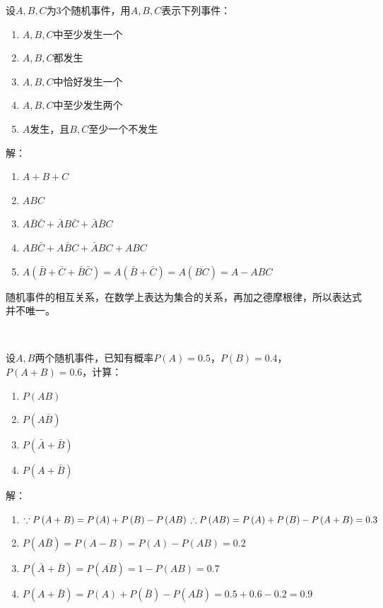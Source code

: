 \begin{example}
设$A,B,C$为3个随机事件，用$A,B,C$表示下列事件：
\begin{enumerate}
    \item $A,B,C$中至少发生一个
    \item $A,B,C$都发生
    \item $A,B,C$中恰好发生一个
    \item $A,B,C$中至少发生两个
    \item $A$发生，且$B,C$至少一个不发生
\end{enumerate}
\end{example}

解：

\begin{enumerate}
    \item $A+B+C$
    \item $ABC$
    \item $A\bar{B}\bar{C}+\bar{A}B\bar{C}+\bar{A}\bar{B}C$
    \item $AB\bar{C}+A\bar{B}C+\bar{A}BC+ABC$
    \item $A\left( \bar{B}+\bar{C}+\bar{B}\bar{C} \right) =A\left( \bar{B}+\bar{C} \right) =A\left( \overline{BC} \right) =A-ABC$
\end{enumerate}

\begin{tcolorbox}
随机事件的相互关系，在数学上表达为集合的关系，再加之德摩根律，所以表达式并不唯一。
\end{tcolorbox}

~

\begin{example}
设$A,B$两个随机事件，已知有概率$P\left( A \right) =0.5$，$P\left( B \right) =0.4$，$P\left( A+B \right) =0.6$，计算：
\begin{enumerate}
    \item $P\left( AB \right) $
    \item $P\left( A\bar{B} \right) $
    \item $P\left( \bar{A}+\bar{B} \right) $
    \item $P\left( A+\bar{B} \right) $
\end{enumerate}
\end{example}

解：

\begin{enumerate}
    \item $\because P\left( A+B \right) =P\left( A \right) +P\left( B \right) -P\left( AB \right) \\
    \therefore P\left( AB \right) =P\left( A \right) +P\left( B \right) -P\left( A+B \right) =0.3$
    \item $P\left( A\bar{B} \right) =P\left( A-B \right) =P\left( A \right) -P\left( AB \right) =0.2$
    \item $P\left( \bar{A}+\bar{B} \right) =P\left( \overline{AB} \right) =1-P\left( AB \right) =0.7$
    \item $P\left( A+\bar{B} \right) =P\left( A \right) +P\left( \bar{B} \right) -P\left( A\bar{B} \right) =0.5+0.6-0.2=0.9$
\end{enumerate}

